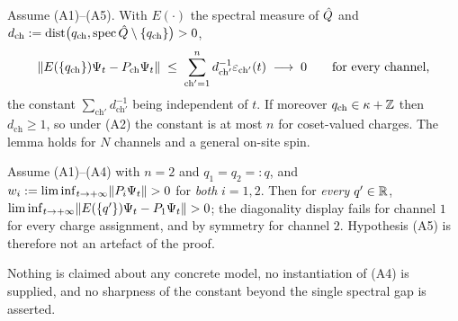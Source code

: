 \begin{lemma}
\label{thm:spectral-diagonality}
\statusProved\;
Assume (A1)--(A5). With $E(\cdot)$ the spectral measure of $\hat{Q}$ and
$d_{\mathrm{ch}}:=\operatorname{dist}\bigl(q_{\mathrm{ch}},\operatorname{spec}\hat{Q}\setminus
\{q_{\mathrm{ch}}\}\bigr)>0$,
\begin{equation}
  \lVert E(\{q_{\mathrm{ch}}\})\Psi_t-P_{\mathrm{ch}}\Psi_t\rVert
  \;\le\;\sum_{\mathrm{ch}'=1}^{n}d_{\mathrm{ch}'}^{-1}
  \varepsilon_{\mathrm{ch}'}(t)\;\longrightarrow\;0
  \qquad\text{for every channel,}
  \label{eq:spectral-diagonality}
\end{equation}
the constant $\sum_{\mathrm{ch}'}d_{\mathrm{ch}'}^{-1}$ being independent of
$t$. If moreover $q_{\mathrm{ch}}\in\kappa+\mathbb{Z}$ then $d_{\mathrm{ch}}\ge1$, so
under (A2) the constant is at most $n$ for coset-valued charges. The lemma
holds for $N$ channels and a general on-site spin.
\end{lemma}

\begin{lemma}
\label{thm:distinct-charges-necessary}
\statusProved\;
Assume (A1)--(A4) with $n=2$ and $q_1=q_2=:q$, and
$w_i:=\liminf_{t\to+\infty}\lVert P_i\Psi_t\rVert>0$ for \emph{both} $i=1,2$. Then
for \emph{every} $q'\in\mathbb{R}$,
$\liminf_{t\to+\infty}\lVert E(\{q'\})\Psi_t-P_1\Psi_t\rVert>0$; the diagonality
display fails for channel $1$ for every charge assignment, and by symmetry for
channel $2$. Hypothesis (A5) is therefore not an artefact of the proof.
\end{lemma}

\begin{scope}
\label{scope:spectral-diagonality}
Nothing is claimed about any concrete model, no instantiation of (A4) is
supplied, and no sharpness of the constant beyond the single spectral gap is
asserted.
\end{scope}

